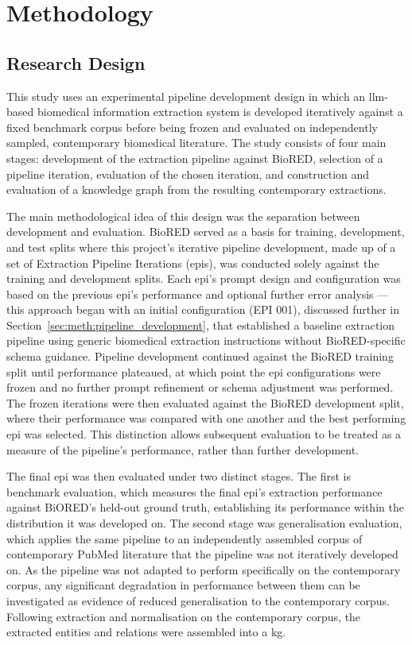 \chapter{Methodology}
\label{chap:methodology}

\section{Research Design}
\label{sec:meth:research_design}
This study uses an experimental pipeline development design in which an \gls{llm}-based biomedical information extraction system is developed iteratively against a fixed benchmark corpus before being frozen and evaluated on independently sampled, contemporary biomedical literature. The study consists of four main stages: development of the extraction pipeline against BioRED, selection of a pipeline iteration, evaluation of the chosen iteration, and construction and evaluation of a knowledge graph from the resulting contemporary extractions.

The main methodological idea of this design was the separation between development and evaluation. BioRED served as a basis for training, development, and test splits where this project's iterative pipeline development, made up of a set of Extraction Pipeline Iterations (\glspl{epi}), was conducted solely against the training and development splits. Each \gls{epi}'s prompt design and configuration was based on the previous \gls{epi}'s performance and optional further error analysis --- this approach began with an initial configuration (EPI 001), discussed further in Section~\ref{sec:meth:pipeline_development}, that established a baseline extraction pipeline using generic biomedical extraction instructions without BioRED-specific schema guidance. Pipeline development continued against the BioRED training split until performance plateaued, at which point the \gls{epi} configurations were frozen and no further prompt refinement or schema adjustment was performed. The frozen iterations were then evaluated against the BioRED development split, where their performance was compared with one another and the best performing \gls{epi} was selected. This distinction allows subsequent evaluation to be treated as a measure of the pipeline's performance, rather than further development.

The final \gls{epi} was then evaluated under two distinct stages. The first is benchmark evaluation, which measures the final \gls{epi}'s extraction performance against BiORED's held-out ground truth, establishing its performance within the distribution it was developed on. The second stage was generalisation evaluation, which applies the same pipeline to an independently assembled corpus of contemporary PubMed literature that the pipeline was not iteratively developed on. As the pipeline was not adapted to perform specifically on the contemporary corpus, any significant degradation in performance between them can be investigated as evidence of reduced generalisation to the contemporary corpus. Following extraction and normalisation on the contemporary corpus, the extracted entities and relations were assembled into a \gls{kg}.


